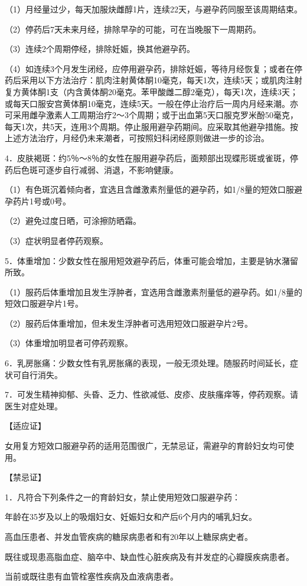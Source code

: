 \documentclass[12pt,UTF8,openany]{ctexbook}
\begin{document}
（1）月经量过少，每天加服炔雌醇1片，连续22天，与避孕药同服至该周期结束。

（2）停药后7天未来月经，排除早孕的可能，可在当晚服下一周期药。

（3）连续2个周期停经，排除妊娠，换其他避孕药。

（4）如连续3个月发生闭经，应停用避孕药，排除妊娠，等待月经恢复；或者在停药后采用以下方法治疗：肌肉注射黄体酮10毫克，每天1次，连续5天；或肌肉注射复方黄体酮1支（内含黄体酮20毫克。苯甲酸雌二醇2毫克），每天1次，连续3天；或每天口服安宫黄体酮10毫克，连续5天。一般在停止治疗后一周内月经来潮。亦可采用雌孕激素人工周期治疗2～3个周期；或于出血第5天口服克罗米酚50毫克，每天1次，共5天，连用3个周期。停止服用避孕药期间。应采取其他避孕措施。按上述方法治疗，月经仍未来潮者，可按照妇科闭经原则做进一步的诊治。

4．皮肤褐斑：约5％～8％的女性在服用避孕药后，面颊部出现蝶形斑或雀斑，停药后色斑可逐步自行减弱、消退，不影响健康。

（1）有色斑沉着倾向者，宜选且含雌激素剂量低的避孕药，如1/8量的短效口服避孕药片1号或0号。

（2）避免过度日晒，可涂擦防晒霜。

（3）症状明显者停药观察。

5．体重增加：少数女性在服用短效避孕药后，体重可能会增加，主要是钠水潴留所致。

（1）服药后体重增加且发生浮肿者，宜选用含雌激素剂量低的避孕药。如1/8量的短效口服避孕片1号。

（2）服药后体重增加，但未发生浮肿者可选用短效口服避孕片2号。

（3）体重增加明显者可停药观察。

6．乳房胀痛：少数女性有乳房胀痛的表现，一般无须处理。随服药时间延长，症状可自行消失。

7．可发生精神抑郁、头昏、乏力、性欲减低、皮疹、皮肤瘙痒等，停药观察。请医生对症处理。

【适应证】

女用复方短效口服避孕药的适用范围很广，无禁忌证，需避孕的育龄妇女均可使用。

【禁忌证】

1．凡符合下列条件之一的育龄妇女，禁止使用短效口服避孕药：

年龄在35岁及以上的吸烟妇女、妊娠妇女和产后6个月内的哺乳妇女。

高血压患者、并发血管疾病的糖尿病患者和有20年以上糖尿病史者。

既往或现患高脂血症、脑卒中、缺血性心脏疾病及有并发症的心瓣膜疾病患者。

当前或既往患有血管栓塞性疾病及血液病患者。
\end{document}
